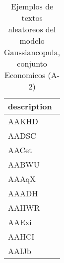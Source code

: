 \begin{table}[H]
\centering
\fontsize{8}{14}\selectfont
\caption{Ejemplos de textos aleatoreos del modelo Gaussiancopula, conjunto Economicos (A-2)}
\label{table-sample10-economicos-a-2-gaussiancopula-text}
\begin{tabular}{|m{50em}|}
\hline
\rowcolor[gray]{0.8}
description \\
\hline AAKHD \\
\hline AADSC \\
\hline AACet \\
\hline AABWU \\
\hline AAAqX \\
\hline AAADH \\
\hline AAHWR \\
\hline AAExi \\
\hline AAHCI \\
\hline AAIJb \\
\hline
\end{tabular}
\end{table}
